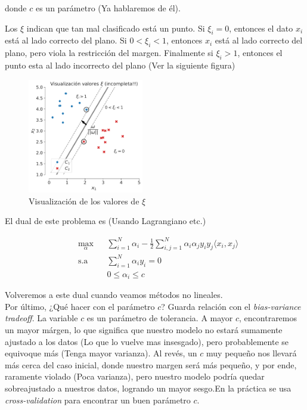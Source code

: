donde $c$ es un parámetro (Ya hablaremos de él).

Los $\xi$ indican que tan mal clasificado está un punto. Si $\xi_i = 0$, entonces el dato $x_i$ está al lado correcto del plano. Si $0<\xi_i <1$, entonces $x_i$ está al lado correcto del plano, pero viola la restricción del margen. Finalmente si $\xi_i>1$, entonces el punto esta al lado incorrecto del plano (Ver la siguiente figura)

\begin{figure}[ht]
    \centering
    \includegraphics[width=0.45\textwidth]{img/cap5_max_margen3}
    \caption{Visualización de los valores de $\xi$}
    \label{fig:my_label4}
\end{figure}

El dual de este problema es (Usando Lagrangiano etc.)

\begin{equation*}
\begin{aligned}
& \underset{\alpha}{\text{max}}
& & \sum\limits_{i=1}^{N}\alpha_i - \frac{1}{2} \sum\limits_{i,j=1}^{N} \alpha_i \alpha_j y_i y_j \langle x_i, x_j\rangle\\
& \text{s.a}
& & \sum\limits_{i=1}^{N} \alpha_i y_i= 0 \\
& &  &0 \leq \alpha_i \leq c
\end{aligned}
\end{equation*}

Volveremos a este dual cuando veamos métodos no lineales. 
\\

Por último, ¿Qué hacer con el parámetro $c$? Guarda relación con el \textit{bias-variance tradeoff}. La variable $c$ es un parámetro de tolerancia. A mayor $c$, encontraremos un mayor márgen, lo que significa que nuestro modelo no estará sumamente ajustado a los datos (Lo que lo vuelve mas insesgado), pero probablemente se equivoque más (Tenga mayor varianza). Al revés, un $c$ muy pequeño nos llevará más cerca del caso inicial, donde nuestro margen será más pequeño, y por ende, raramente violado (Poca varianza), pero nuestro modelo podría quedar sobreajustado a nuestros datos, logrando un mayor sesgo.En la práctica se usa \textit{cross-validation} para encontrar un buen parámetro $c$.  


